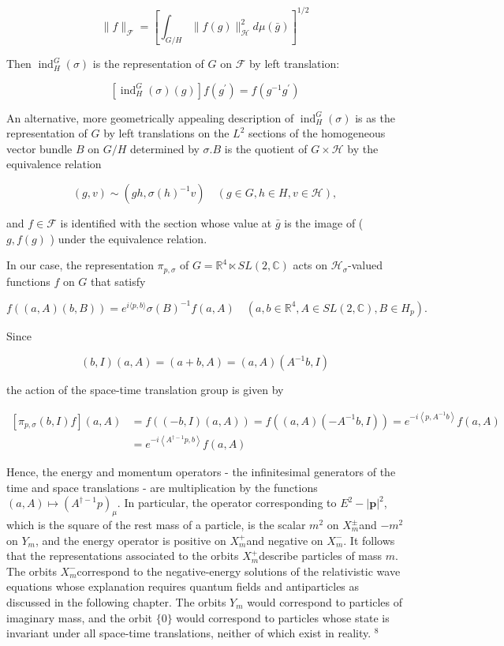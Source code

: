 \documentclass[10pt, letterpaper]{article}
\begin{document}
$$
\|f\|_{\mathcal{F}}=\left[\int_{G / H}\|f(g)\|_{\mathcal{H}}^{2} d \mu(\bar{g})\right]^{1 / 2}
$$

Then $\operatorname{ind}_{H}^{G}(\sigma)$ is the representation of $G$ on $\mathcal{F}$ by left translation:

$$
\left[\operatorname{ind}_{H}^{G}(\sigma)(g)\right] f\left(g^{\prime}\right)=f\left(g^{-1} g^{\prime}\right)
$$

An alternative, more geometrically appealing description of $\operatorname{ind}_{H}^{G}(\sigma)$ is as the representation of $G$ by left translations on the $L^{2}$ sections of the homogeneous vector bundle $B$ on $G / H$ determined by $\sigma . B$ is the quotient of $G \times \mathcal{H}$ by the equivalence relation

$$
(g, v) \sim\left(g h, \sigma(h)^{-1} v\right) \quad(g \in G, h \in H, v \in \mathcal{H}),
$$

and $f \in \mathcal{F}$ is identified with the section whose value at $\bar{g}$ is the image of ( $g, f(g)$ ) under the equivalence relation.

In our case, the representation $\pi_{p, \sigma}$ of $G=\mathbb{R}^{4} \ltimes S L(2, \mathbb{C})$ acts on $\mathcal{H}_{\sigma}$-valued functions $f$ on $G$ that satisfy

$$
f((a, A)(b, B))=e^{i\langle p, b\rangle} \sigma(B)^{-1} f(a, A) \quad\left(a, b \in \mathbb{R}^{4}, A \in S L(2, \mathbb{C}), B \in H_{p}\right) .
$$

Since

$$
(b, I)(a, A)=(a+b, A)=(a, A)\left(A^{-1} b, I\right)
$$

the action of the space-time translation group is given by

$$
\begin{aligned}
{\left[\pi_{p, \sigma}(b, I) f\right](a, A) } & =f((-b, I)(a, A))=f\left((a, A)\left(-A^{-1} b, I\right)\right)=e^{-i\left\langle p, A^{-1} b\right\rangle} f(a, A) \\
& =e^{-i\left\langle A^{\dagger-1} p, b\right\rangle} f(a, A)
\end{aligned}
$$

Hence, the energy and momentum operators - the infinitesimal generators of the time and space translations - are multiplication by the functions $(a, A) \mapsto \left(A^{\dagger-1} p\right)_{\mu}$. In particular, the operator corresponding to $E^{2}-|\mathbf{p}|^{2}$, which is the square of the rest mass of a particle, is the scalar $m^{2}$ on $X_{m}^{ \pm}$and $-m^{2}$ on $Y_{m}$, and the energy operator is positive on $X_{m}^{+}$and negative on $X_{m}^{-}$. It follows that the representations associated to the orbits $X_{m}^{+}$describe particles of mass $m$. The orbits $X_{m}^{-}$correspond to the negative-energy solutions of the relativistic wave equations whose explanation requires quantum fields and antiparticles as discussed in the following chapter. The orbits $Y_{m}$ would correspond to particles of imaginary mass, and the orbit $\{0\}$ would correspond to particles whose state is invariant under all space-time translations, neither of which exist in reality. ${ }^{8}$
\end{document}
